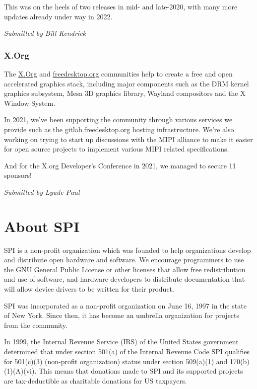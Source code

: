 \documentclass[a4paper]{report}
\begin{document}
This was on the heels of two releases in mid- and late-2020, with many more updates already under way in 2022.

{\em Submitted by Bill Kendrick}

\subsection{X.Org}

The \href{https://www.x.org/}{X.Org} and \href{https://www.freedesktop.org}{freedesktop.org} communities help to create a free and open accelerated graphics stack, including major components such as the DRM kernel graphics subsystem, Mesa 3D graphics library, Wayland compositors and the X Window System.

In 2021, we've been supporting the community through various services we provide such as the gitlab.freedesktop.org hosting infrastructure. We're also working on trying to start up discussions with the MIPI alliance to make it easier for open source projects to implement various MIPI related specifications.

And for the X.org Developer's Conference in 2021, we managed to secure 11 sponsors!

{\em Submitted by Lyude Paul}


\appendix
\chapter{About SPI}

SPI is a non-profit organization which was founded to help organizations develop and distribute open hardware and software. We encourage programmers to use the GNU General Public License or other licenses that allow free redistribution and use of software, and hardware developers to distribute documentation that will allow device drivers to be written for their product.

SPI was incorporated as a non-profit organization on June 16, 1997 in the state of New York. Since then, it has become an umbrella organization for projects from the community.

In 1999, the Internal Revenue Service (IRS) of the United States government determined that under section 501(a) of the Internal Revenue Code SPI qualifies for 501(c)(3) (non-profit organization) status under section 509(a)(1) and 170(b)(1)(A)(vi). This means that donations made to SPI and its supported projects are tax-deductible as charitable donations for US taxpayers.
\end{document}

